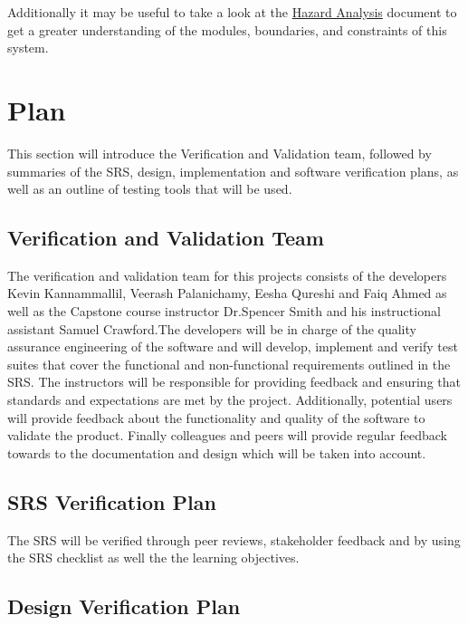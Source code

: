 \documentclass[12pt, titlepage]{article}
\begin{document}
	Additionally it may be useful to take a look at the \href{https://github.com/RutheniumVI/UnderTree/blob/main/docs/HazardAnalysis/HazardAnalysis.pdf}{Hazard Analysis} document to get a greater understanding of the modules, boundaries, and constraints of this system.
	
	\section{Plan}
	
	This section will introduce the Verification and Validation team, followed by summaries of the SRS, design, implementation and software verification plans, as well as an outline of testing tools that will be used.
	
	\subsection{Verification and Validation Team}
	
	The verification and validation team for this projects consists of the developers Kevin Kannammallil, Veerash Palanichamy, Eesha Qureshi and Faiq Ahmed as well as the Capstone course instructor Dr.Spencer Smith and his instructional assistant Samuel Crawford.The developers will be in charge of the quality assurance engineering of the software and will develop, implement and verify test suites that cover the functional and non-functional requirements outlined in the SRS. The instructors will be responsible for providing feedback and ensuring that standards and expectations are met by the project. Additionally, potential users will provide feedback about the functionality and quality of the software to validate the product. Finally colleagues and peers will provide regular feedback towards to the documentation and design which will be taken into account.  
	
	\subsection{SRS Verification Plan}
	
	The SRS will be verified through peer reviews, stakeholder feedback and by using the SRS checklist as well the the learning objectives.
	
	\subsection{Design Verification Plan}
	
\end{document}
